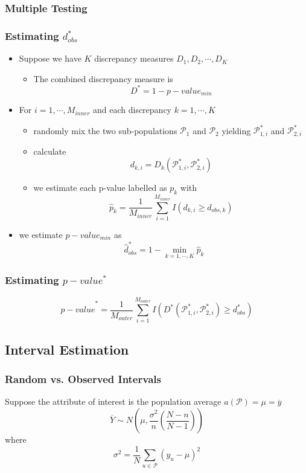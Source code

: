 \documentclass[11pt]{article}
\begin{document}
\subsubsection{Multiple Testing}
\subsubsection*{Estimating $d^*_{obs}$}
\begin{itemize}
    \item Suppose we have $K$ discrepancy measures $D_1,D_2,\cdots,D_K$ 
    \begin{itemize}
        \item The combined discrepancy measure is \[D^* = 1 - p-value_{min}\]
    \end{itemize}
    \item For $i=1,\cdots,M_{inner}$ and each discrepancy $k=1,\cdots,K$
    \begin{itemize}
        \item randomly mix the two sub-populations $\mathcal{P}_1$ and $\mathcal{P}_2$ yielding $\mathcal{P}^*_{1,i}$ and $\mathcal{P}^*_{2,i}$
        \item calculate \[d_{k,i} = D_k(\mathcal{P}^*_{1,i},\mathcal{P}^*_{2,i})\]
        \item we estimate each p-value labelled as $p_k$ with \[\hat{p}_k = \frac{1}{M_{inner}}\sum_{i=1}^{M_{inner}}I(d_{k,i}\geq d_{obs,k})\]
    \end{itemize}
    \item we estimate $p-value_{min}$ as \[\hat{d}^*_{obs} = 1 - \min_{k=1,\cdots,K}\hat{p}_k\]
\end{itemize}
\subsubsection*{Estimating $p-value^*$}
\[\hat{p-value}^* = \frac{1}{M_{outer}}\sum_{i=1}^{M_{outer}}I(D^*(\mathcal{P}^*_{1,i},\mathcal{P}^*_{2,i})\geq d^*_{obs})\]
\subsection{Interval Estimation}
\subsubsection{Random vs. Observed Intervals}
Suppose the attribute of interest is the population average $a(\mathcal{P}) = \mu = \overline{y}$
\[\overline{Y}\sim N(\mu, \frac{\sigma^2}{n}(\frac{N-n}{N-1}))\]
where \[\sigma^2 = \frac{1}{N}\sum_{u\in\mathcal{P}}(y_u - \mu)^2\]
\end{document}

